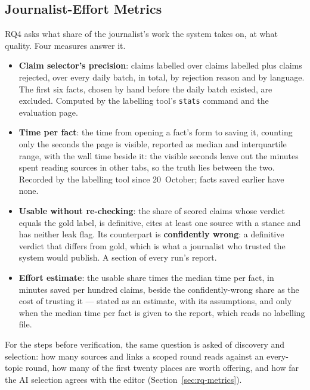 
\subsection{Journalist-Effort Metrics}
\label{subsec:harness-effort}

RQ4 asks what share of the journalist's work the system takes on, at
what quality. Four measures answer it.

\begin{itemize}
    \item \textbf{Claim selector's precision}: claims labelled over
    claims labelled plus claims rejected, over every daily batch, in
    total, by rejection reason and by language. The first six facts,
    chosen by hand before the daily batch existed, are excluded.
    Computed by the labelling tool's \texttt{stats} command and the
    evaluation page.
    \item \textbf{Time per fact}: the time from opening a fact's form to
    saving it, counting only the seconds the page is visible, reported
    as median and interquartile range, with the wall time beside it:
    the visible seconds leave out the minutes spent reading sources in
    other tabs, so the truth lies between the two. Recorded by the
    labelling tool since 20~October; facts saved earlier have none.
    \item \textbf{Usable without re-checking}: the share of scored
    claims whose verdict equals the gold label, is definitive, cites at
    least one source with a stance and has neither leak flag. Its
    counterpart is \textbf{confidently wrong}: a definitive verdict
    that differs from gold, which is what a journalist who trusted the
    system would publish. A section of every run's report.
    \item \textbf{Effort estimate}: the usable share times the median
    time per fact, in minutes saved per hundred claims, beside the
    confidently-wrong share as the cost of trusting it --- stated as an
    estimate, with its assumptions, and only when the median time per
    fact is given to the report, which reads no labelling file.
\end{itemize}

For the steps before verification, the same question is asked of
discovery and selection: how many sources and links a scoped round
reads against an every-topic round, how many of the first twenty
places are worth offering, and how far the AI selection agrees with
the editor (Section~\ref{sec:rq-metrics}).
